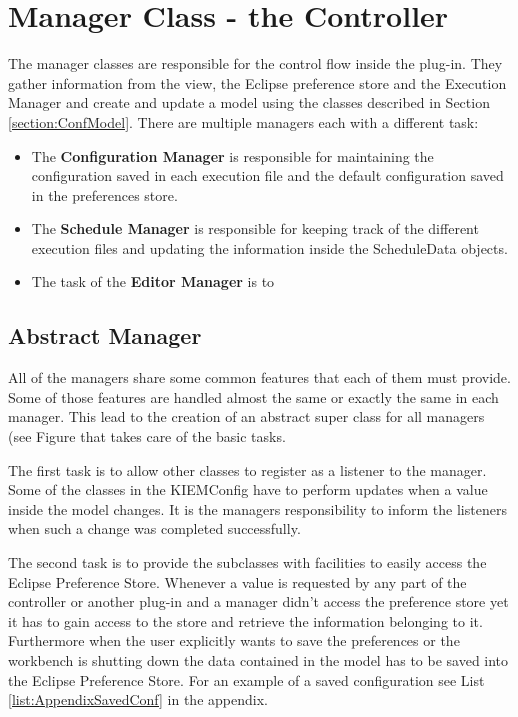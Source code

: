 \section{Manager Class - the Controller}
\label{section:ConfController}
The manager classes are responsible for the control flow inside the plug-in. They gather information
from the view, the Eclipse preference store and the Execution Manager and create and update a
model using the classes described in Section \ref{section:ConfModel}. There are multiple managers
each with a different task:
\begin{itemize}
 \item The \textbf{Configuration Manager} is responsible for maintaining the configuration saved in
each execution file and the default configuration saved in the preferences store.
 \item The \textbf{Schedule Manager} is responsible for keeping track of the different
execution files and updating the information inside the ScheduleData objects.
 \item The task of the \textbf{Editor Manager} is to
\end{itemize}



\subsection{Abstract Manager}
\label{section:AbstractManager}
All of the managers share some common features that each of them must provide. Some of those
features are handled almost the same or exactly the same in each manager. This lead to the creation
of an abstract super class for all managers (see Figure  %
that takes care of the basic tasks.

The first task is to allow other classes to register as a listener to the manager. Some of the classes
in the \ac{KIEMConfig} have to perform updates when a value inside the model changes. It is the managers
responsibility to inform the listeners when such a change was completed successfully.

The second task is to provide the subclasses with facilities to easily access the Eclipse Preference Store.
Whenever a value is requested by any part of the controller or another plug-in and a manager didn't access
the preference store yet it has to gain access to the store and retrieve the information belonging to it.
Furthermore when the user explicitly wants to save the preferences or the workbench is shutting down the
data contained in the model has to be saved into the Eclipse Preference Store. For an example of a 
saved configuration see List \ref{list:AppendixSavedConf} in the appendix.


